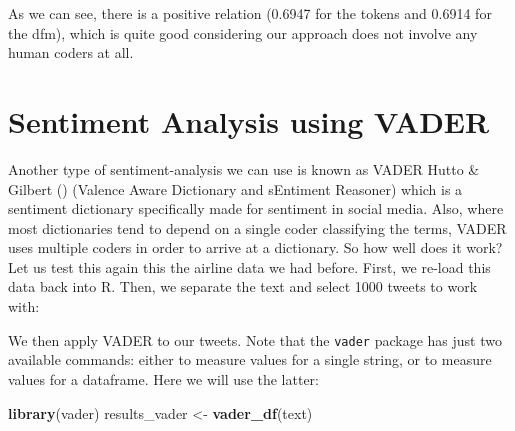 \documentclass[
]{book}
\newenvironment{Shaded}{\begin{snugshade}}{\end{snugshade}}
\newcommand{\DecValTok}[1]{\textcolor[rgb]{0.00,0.00,0.81}{#1}}
\newcommand{\FunctionTok}[1]{\textcolor[rgb]{0.13,0.29,0.53}{\textbf{#1}}}
\newcommand{\NormalTok}[1]{#1}
\newcommand{\OtherTok}[1]{\textcolor[rgb]{0.56,0.35,0.01}{#1}}
\newcommand{\SpecialCharTok}[1]{\textcolor[rgb]{0.81,0.36,0.00}{\textbf{#1}}}
\newcommand{\StringTok}[1]{\textcolor[rgb]{0.31,0.60,0.02}{#1}}
\begin{document}
As we can see, there is a positive relation (0.6947 for the tokens and 0.6914 for the dfm), which is quite good considering our approach does not involve any human coders at all.

\section{Sentiment Analysis using VADER}\label{sentiment-analysis-using-vader}

Another type of sentiment-analysis we can use is known as VADER Hutto \& Gilbert () (Valence Aware Dictionary and sEntiment Reasoner) which is a sentiment dictionary specifically made for sentiment in social media. Also, where most dictionaries tend to depend on a single coder classifying the terms, VADER uses multiple coders in order to arrive at a dictionary. So how well does it work? Let us test this again this the airline data we had before. First, we re-load this data back into R. Then, we separate the text and select 1000 tweets to work with:

\begin{Shaded}
\end{Shaded}

We then apply VADER to our tweets. Note that the \texttt{vader} package has just two available commands: either to measure values for a single string, or to measure values for a dataframe. Here we will use the latter:

\begin{Shaded}
\begin{Highlighting}[]
\FunctionTok{library}\NormalTok{(vader)}
\NormalTok{results\_vader }\OtherTok{\textless{}{-}} \FunctionTok{vader\_df}\NormalTok{(text)}
\end{Highlighting}
\end{Shaded}
\end{document}
